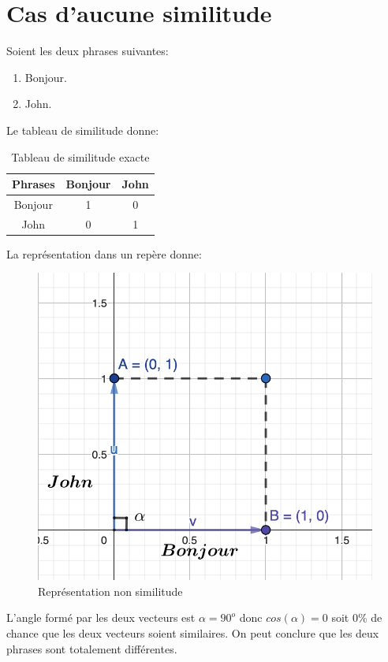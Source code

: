 \documentclass[a4paper, 14pt]{article}
\begin{document}
    \section{Cas d'aucune similitude}
    Soient les deux phrases suivantes:
    \begin{enumerate}
    	\item Bonjour.
    	\item John.
    \end{enumerate}
	Le tableau de similitude donne:
	  \begin{table}[H]
		\centering
		\begin{tabular}{|c|c|c|}
			\hline
			\textbf{Phrases} & \textbf{Bonjour} & \textbf{John} \\
			\hline
			Bonjour & 1 & 0 \\
			John  & 0 & 1 \\
			\hline
		\end{tabular}
		\caption{Tableau de similitude exacte}
		\label{tab:nonsimilarite}
	\end{table}
	\newpage
	La représentation dans un repère donne:
	\begin{figure}[H]
		\includegraphics[scale=0.5, width=15cm]{./img/vecteur_non_similitude.png}
		\caption{Représentation non similitude}
	\end{figure}
	L'angle formé par les deux vecteurs est $\alpha = 90^{o}$ donc $cos(\alpha) = 0$ soit 0\% de chance que les deux vecteurs soient similaires. On peut conclure que les deux phrases sont totalement différentes.
\end{document}
